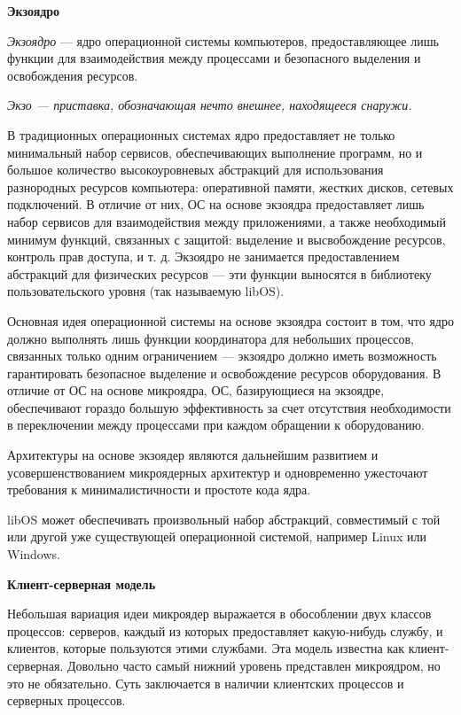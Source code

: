 \textbf{Экзоядро}

\textit{Экзоядро} — ядро операционной системы компьютеров, предоставляющее лишь функции для взаимодействия между процессами и безопасного выделения и освобождения ресурсов.

\textit{Экзо — приставка, обозначающая нечто внешнее, находящееся снаружи.}

В традиционных операционных системах ядро предоставляет не только минимальный набор сервисов, обеспечивающих выполнение программ, но и большое количество высокоуровневых абстракций для использования разнородных ресурсов компьютера: оперативной памяти, жестких дисков, сетевых подключений. В отличие от них, ОС на основе экзоядра предоставляет лишь набор сервисов для взаимодействия между приложениями, а также необходимый минимум функций, связанных с защитой: выделение и высвобождение ресурсов, контроль прав доступа, и т. д. Экзоядро не занимается предоставлением абстракций для физических ресурсов — эти функции выносятся в библиотеку пользовательского уровня (так называемую libOS).

Основная идея операционной системы на основе экзоядра состоит в том, что ядро должно выполнять лишь функции координатора для небольших процессов, связанных только одним ограничением — экзоядро должно иметь возможность гарантировать безопасное выделение и освобождение ресурсов оборудования. В отличие от ОС на основе микроядра, ОС, базирующиеся на экзоядре, обеспечивают гораздо большую эффективность за счет отсутствия необходимости в переключении между процессами при каждом обращении к оборудованию.

Архитектуры на основе экзоядер являются дальнейшим развитием и усовершенствованием микроядерных архитектур и одновременно ужесточают требования к минималистичности и простоте кода ядра.

libOS может обеспечивать произвольный набор абстракций, совместимый с той или другой уже существующей операционной системой, например Linux или Windows.
\newline

\textbf{Клиент-серверная модель}

Небольшая вариация идеи микроядер выражается в обособлении двух классов процессов: серверов, каждый из которых предоставляет какую-нибудь службу, и клиентов, которые пользуются этими службами. Эта модель известна как клиент-серверная. Довольно часто самый нижний уровень представлен микроядром, но это не обязательно. Суть заключается в наличии клиентских процессов и серверных процессов.

